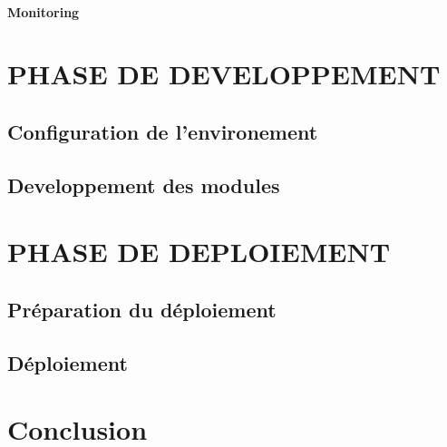 \documentclass[11pt,a4paper]{report}
\begin{document}
   \subsubsection{Monitoring}


\chapter{PHASE DE DEVELOPPEMENT}
\section{Configuration de l'environement}
\section{Developpement des modules}

\chapter{PHASE DE DEPLOIEMENT}
\section{Préparation du déploiement}
\section{Déploiement}

\chapter*{Conclusion}
\end{document}
